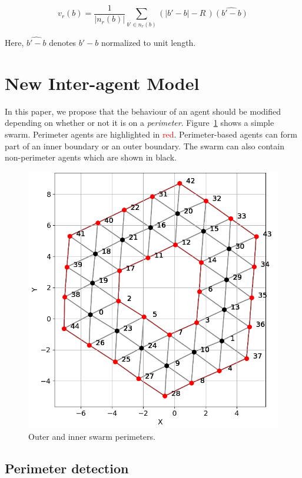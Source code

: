 \documentclass[12pt,a4paper]{IEEEtran}
\newcommand{\card}[1]{\vert{#1}\vert}
\newcommand{\vbb}[2]{#2-#1}
\begin{document}
\begin{equation}\label{eq:repulsion2a}
v_r(b) = \frac{1}{\card{n_r(b)}}\sum_{b' \in n_r(b)} \left(\card{\vbb{b}{b'}} - R \, \right)\widehat{\left(\vbb{b}{b'}\right)}
\end{equation}

Here, $\widehat{\vbb{b}{b'}}$ denotes $\vbb{b}{b'}$ normalized to unit length.

\section{New Inter-agent Model}
In this paper, we propose that the behaviour of an agent should be modified depending on whether or not it is on a \emph{perimeter}. Figure~\ref{fig:simplePerim2} shows a simple swarm. Perimeter agents are highlighted in \textcolor{red}{red}. Perimeter-based agents can form part of an inner boundary or an outer boundary. The swarm can also contain non-perimeter agents which are shown in black.

\begin{figure}[H]
	\begin{center}
		\includegraphics[width=0.8\linewidth]{figures/relationships2}
	\end{center}
	\caption{Outer and inner swarm perimeters. \label{fig:simplePerim2}}
\end{figure}


\subsection{Perimeter detection}\label{sec:perimeterDetection} 
\end{document}

